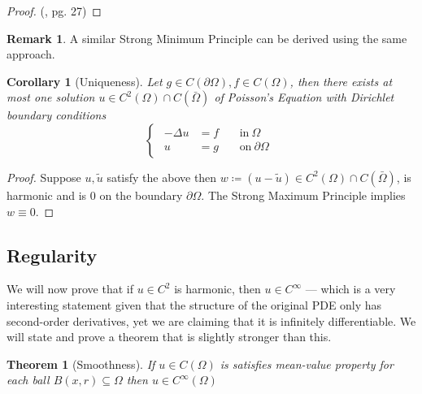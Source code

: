 \documentclass[openany, amssymb, psamsfonts]{amsart}
\newtheorem{thm}{Theorem}[section]
\newtheorem{cor}{Corollary}[section]
\theoremstyle{definition}
\newtheorem{rem}{Remark}[section]
\numberwithin{equation}{section}
\begin{document}
\begin{proof}
(\cite{Evans}, pg. 27)
\end{proof}
\begin{rem}
A similar Strong Minimum Principle can be derived using the same approach.
\end{rem}

\begin{cor} [Uniqueness]
Let $g \in C(\partial \Omega), f \in C(\Omega)$, then there exists at most one solution $u \in C^2(\Omega) \cap C(\bar{\Omega})$ of Poisson's Equation with Dirichlet boundary conditions 
\begin{equation} \label{poisson_dirichlet}
    \begin{cases}
        \begin{aligned}
            -\Delta u &= f &&\:\text{in}\:  \Omega \\
            u &= g &&\:\text{on}\: \partial \Omega
        \end{aligned}
    \end{cases}
\end{equation}
\end{cor}
\begin{proof}
    Suppose $u, \tilde{u}$ satisfy the above then $w \coloneqq (u - \tilde{u})\in C^2(\Omega) \cap C(\bar{\Omega})$, is harmonic and is 0 on the boundary $\partial \Omega$. The Strong Maximum Principle implies $w \equiv 0$.
\end{proof}

\subsection{Regularity}
We will now prove that if $u \in C^2$ is harmonic, then $u \in C^\infty$ --- which is a very interesting statement given that the structure of the original PDE only has second-order derivatives, yet we are claiming that it is infinitely differentiable. We will state and prove a theorem that is slightly stronger than this.
\begin{thm} [Smoothness]
    If $u \in C(\Omega)$ is satisfies mean-value property for each ball $B(x, r) \subseteq \Omega$ then $u \in C^{\infty} (\Omega)$ 
\end{thm}
\end{document}
